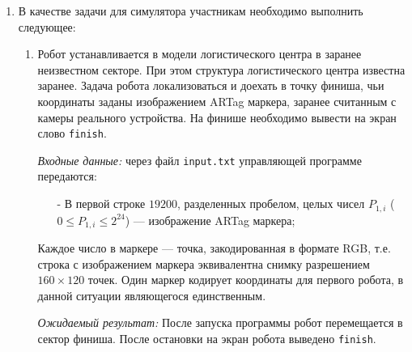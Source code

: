 
\begin{enumerate}
    \item В качестве задачи для симулятора участникам необходимо выполнить следующее:
    \begin{enumerate}
        \item Робот устанавливается в модели логистического центра в заранее неизвестном
        секторе. При этом структура логистического центра известна заранее.
        Задача робота локализоваться и доехать в точку финиша, чьи
        координаты заданы изображением ARTag маркера, заранее считанным с камеры реального
        устройства. На финише необходимо вывести на экран слово \texttt{finish}.

        \textit{Входные данные:} через файл \texttt{input.txt} управляющей программе передаются:
        \begin{enumerate}
            \item[-] В первой строке $19200$, разделенных пробелом, целых чисел $P_{1,i}$
            ($0 \le P_{1,i} \le 2^{24}$) --- изображение ARTag маркера;
        \end{enumerate}
        Каждое число в маркере --- точка, закодированная в формате RGB, т.е. строка с изображением
        маркера эквивалентна снимку разрешением $160 \times 120$ точек. Один маркер кодирует
        координаты для первого робота, в данной ситуации являющегося единственным.

        \textit{Ожидаемый результат:} После запуска программы робот перемещается в сектор финиша.
        После остановки на экран робота выведено \texttt{finish}.


\end{enumerate}
\end{enumerate}
